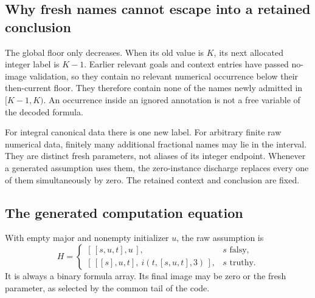 \documentclass[11pt,letterpaper]{article}
\theoremstyle{definition}\newtheorem{definition}[theorem]{Definition}
\theoremstyle{remark}\newtheorem{remark}[theorem]{Remark}
\begin{document}
\subsection{Why fresh names cannot escape into a retained conclusion}

The global floor only decreases. When its old value is \(K\), its
next allocated integer label is \(K-1\). Earlier relevant goals and
context entries have passed no-image validation, so they contain no
relevant numerical occurrence below their then-current floor. They
therefore contain none of the names newly admitted in \([K-1,K)\).
An occurrence inside an ignored annotation is not a free variable of
the decoded formula.

For integral canonical data there is one new label. For arbitrary
finite raw numerical data, finitely many additional fractional names
may lie in the interval. They are distinct fresh parameters, not
aliases of its integer endpoint. Whenever a generated assumption
uses them, the zero-instance discharge replaces every one of them
simultaneously by zero. The retained context and conclusion are fixed.

\subsection{The generated computation equation}

With empty major and nonempty initializer \(u\), the raw assumption is
\[
 H=\begin{cases}
 [\,[s,u,t],u\,],&s\text{ falsy},\\
 [\,[[s],u,t],\ i(t,[s,u,t],3)\,],&s\text{ truthy}.
 \end{cases}
\]
It is always a binary formula array. Its final image may be zero or
the fresh parameter, as selected by the common tail of the code.
\end{document}

